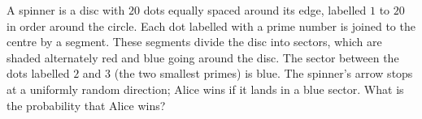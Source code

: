 A spinner is a disc with $20$ dots equally spaced around its edge, labelled $1$ to $20$ in order around the circle. Each dot labelled with a prime number is joined to the centre by a segment. These segments divide the disc into sectors, which are shaded alternately red and blue going around the disc. The sector between the dots labelled $2$ and $3$ (the two smallest primes) is blue. The spinner's arrow stops at a uniformly random direction; Alice wins if it lands in a blue sector. What is the probability that Alice wins?
